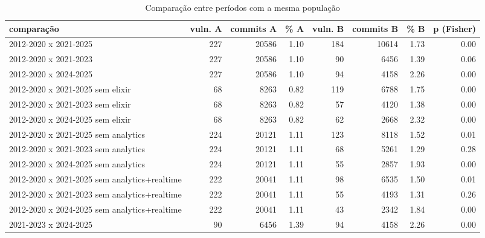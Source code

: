 \begin{table}[htbp]
\centering
\caption{Comparação entre períodos com a mesma população}
\label{tab:comparacoes}
\begin{tabular}{lrrrrrrr}
\toprule
comparação & vuln. A & commits A & \% A & vuln. B & commits B & \% B & p (Fisher) \\
\midrule
2012-2020 x 2021-2025 & 227 & 20586 & 1.10 & 184 & 10614 & 1.73 & 0.00 \\
2012-2020 x 2021-2023 & 227 & 20586 & 1.10 & 90 & 6456 & 1.39 & 0.06 \\
2012-2020 x 2024-2025 & 227 & 20586 & 1.10 & 94 & 4158 & 2.26 & 0.00 \\
2012-2020 x 2021-2025 sem elixir & 68 & 8263 & 0.82 & 119 & 6788 & 1.75 & 0.00 \\
2012-2020 x 2021-2023 sem elixir & 68 & 8263 & 0.82 & 57 & 4120 & 1.38 & 0.00 \\
2012-2020 x 2024-2025 sem elixir & 68 & 8263 & 0.82 & 62 & 2668 & 2.32 & 0.00 \\
2012-2020 x 2021-2025 sem analytics & 224 & 20121 & 1.11 & 123 & 8118 & 1.52 & 0.01 \\
2012-2020 x 2021-2023 sem analytics & 224 & 20121 & 1.11 & 68 & 5261 & 1.29 & 0.28 \\
2012-2020 x 2024-2025 sem analytics & 224 & 20121 & 1.11 & 55 & 2857 & 1.93 & 0.00 \\
2012-2020 x 2021-2025 sem analytics+realtime & 222 & 20041 & 1.11 & 98 & 6535 & 1.50 & 0.01 \\
2012-2020 x 2021-2023 sem analytics+realtime & 222 & 20041 & 1.11 & 55 & 4193 & 1.31 & 0.26 \\
2012-2020 x 2024-2025 sem analytics+realtime & 222 & 20041 & 1.11 & 43 & 2342 & 1.84 & 0.00 \\
2021-2023 x 2024-2025 & 90 & 6456 & 1.39 & 94 & 4158 & 2.26 & 0.00 \\
\bottomrule
\end{tabular}
\end{table}
